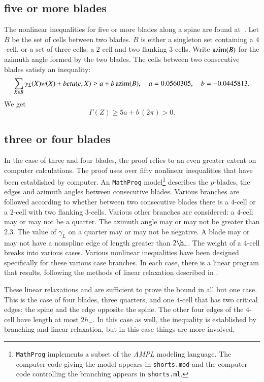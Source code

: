 \subsection{five or more blades}

The nonlinear inequalities for five or more blades along a spine are found at~\cite[cc:5bl:ZTGIJCF]{hales:2009:nonlinear}.   Let $B$ be the set of cells between two blades.  $B$ is either a singleton set containing a $4$-cell, or a set of three cells: a $2$-cell and two flanking $3$-cells.  Write ${\operatorname{azim}}(B)$ for the azimuth angle formed by the two blades.   The cells between two consecutive blades satisfy an inequality:
$$
\sum_{X\in B} \gamma_L(X)w(X) + beta(e,X) \ge a + b\,{\operatorname{azim}}(B),
\quad a= 0.0560305, \quad b= -0.0445813.
$$
We get
$$
\Gamma(Z) \ge 5 a + b\, (2\pi) > 0.
$$

\subsection{three or four blades}

In the case of three and four blades, the proof relies to an even greater extent on computer calculations.
The proof uses over fifty nonlinear inequalities that have been established by computer.  An {\tt MathProg} model\footnote{{\tt MathProg} implements a subset of the {\it AMPL} modeling language.  The computer code giving the model appears in {\tt shorts.mod} and the computer code controlling the branching appears in {\tt shorts.ml}.} describes the $p$-blades, the edges and azimuth angles between consecutive blades.  Various branches are followed according to whether between two consecutive blades there is a $4$-cell or a $2$-cell with two flanking $3$-cells.   Various other branches are considered: a $4$-cell may or may not be a quarter.  The azimuth angle may or may not be greater than $2.3$.  The value of $\gamma_L$ on a quarter may or may not be negative.  A blade may or may not have a nonspline edge of length greater than $2\h_-$.  The weight of a $4$-cell breaks into various cases.   Various nonlinear inequalities have been designed specifically for these various case branches.  In each case, there is a linear program that results, following the methods of linear relaxation described in \cite{Hales:2006:DCG}.  

These linear relaxations and are sufficient to prove the bound in all but one case.  This is the case of four blades, three quarters, and one $4$-cell that has two critical edges: the spine and the edge opposite the spine.  The other four edges of the $4$-cell have length at most $2h_-$.  In this case as well, the inequality is established by branching and linear relaxation, but in this case things are more involved.  

